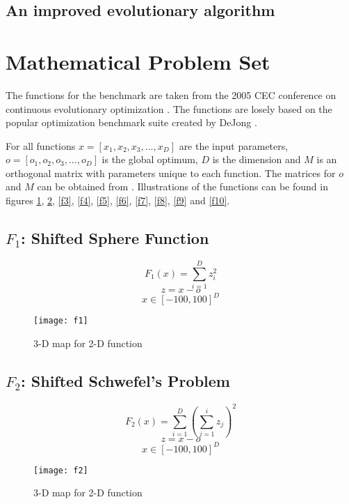 \subsection{An improved evolutionary algorithm}

\section{Mathematical Problem Set}

The functions for the benchmark are taken from the 2005 CEC conference on continuous evolutionary optimization \cite{suganthan2005problem}. The functions are losely based on the popular optimization benchmark suite created by DeJong \cite{Whitley1996245}.

For all functions $x=[x_1,x_2,x_3,...,x_D]$ are the input parameters, $o=[o_1,o_2,o_3,...,o_D]$ is the global optimum, $D$ is the dimension and $M$ is an orthogonal matrix with parameters unique to each function. The matrices for $o$ and $M$ can be obtained from \cite{suganthan2005problem}. Illustrations of the functions can be found in figures \ref{f1}, \ref{f2}, \ref{f3}, \ref{f4}, \ref{f5}, \ref{f6}, \ref{f7}, \ref{f8}, \ref{f9} and \ref{f10}.

\subsection{$F_1$: Shifted Sphere Function}

\begin{equation}
  F_1(x)=\sum_{i=1}^{D}{z_i^2}
\end{equation}
\[ z=x-o \]
\[ x \in [-100,100]^D \]

\begin{figure}[H]
  \centering
  \texttt{[image: f1]}
  \caption{3-D map for 2-D function}
  \label{f1}
\end{figure}

\subsection{$F_2$: Shifted Schwefel’s Problem}

\begin{equation}
  F_2(x)=\sum_{i=1}^{D}{(\sum_{j=1}^{i}{z_j})^2}
\end{equation}
\[ z=x-o \]
\[ x \in [-100,100]^D \]

\begin{figure}[H]
  \centering
  \texttt{[image: f2]}
  \caption{3-D map for 2-D function}
  \label{f2}
\end{figure}

